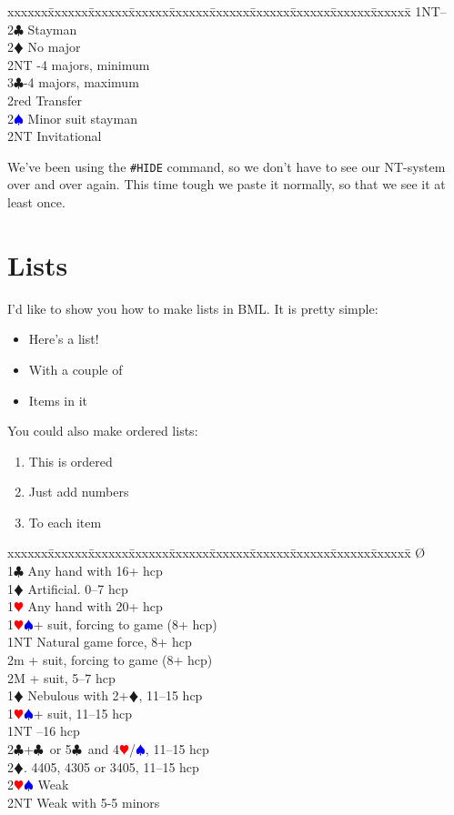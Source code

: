 \documentclass[a4paper]{article}
\newcommand{\BC}{\textcolor{OliveGreen}{$\clubsuit$}}
\newcommand{\BD}{\textcolor{RedOrange}{$\vardiamondsuit$}}
\newcommand{\BH}{\textcolor{Red}{$\varheartsuit${}}}
\newcommand{\BS}{\textcolor{Blue}{$\spadesuit${}}}
\newenvironment{bidtable}
{\begin{tabbing}

xxxxxx\=xxxxxx\=xxxxxx\=xxxxxx\=xxxxxx\=xxxxxx\=xxxxxx\=xxxxxx\=xxxxxx\=xxxxxx\=\kill}
{\end{tabbing} }%
\begin{document}
\begin{bidtable}
1NT--\+\\
2\BC \> Stayman\+\\
2\BD \> No major\\
2NT -4 majors, minimum\\
3\BC {}-4 majors, maximum\-\\
2red \> Transfer\\
2\BS \> Minor suit stayman\\
2NT \> Invitational\-
\end{bidtable}

We've been using the \texttt{\#HIDE} command, so we don't have to see our
NT-system over and over again. This time tough we paste it
normally, so that we see it at least once.

\section{Lists}

I'd like to show you how to make lists in BML. It is pretty
simple:

\begin{itemize}
\item Here's a list!

\item With a couple of

\item Items in it

\end{itemize}

You could also make ordered lists:

\begin{enumerate}
\item This is ordered

\item Just add numbers

\item To each item

\end{enumerate}

\begin{bidtable}
\O\+\\
1\BC \> Any hand with 16+ hcp\+\\
1\BD \> Artificial. 0--7 hcp\+\\
1\BH \> Any hand with 20+ hcp\-\\
1\BH\BS {}+ suit, forcing to game (8+ hcp)\\
1NT \> Natural game force, 8+ hcp\\
2m + suit, forcing to game (8+ hcp)\\
2M + suit, 5--7 hcp\-\\
1\BD \> Nebulous with 2+\BD , 11--15 hcp\\
1\BH\BS {}+ suit, 11--15 hcp\\
1NT --16 hcp\\
2\BC {}+\BC\ or 5\BC\ and 4\BH /\BS , 11--15 hcp\\
2\BD {}. 4405, 4305 or 3405, 11--15 hcp\\
2\BH\BS \> Weak\\
2NT \> Weak with 5-5 minors\-
\end{bidtable}
\end{document}
